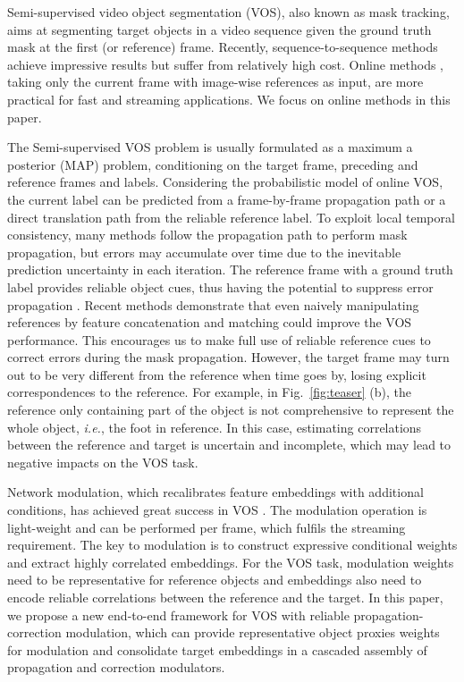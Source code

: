 \documentclass[letterpaper]{article} \usepackage{aaai22}  \usepackage{times}  \usepackage{helvet}  \usepackage{courier}  \usepackage[hyphens]{url}  \usepackage{graphicx} \urlstyle{rm} \def\UrlFont{\rm}  \usepackage{natbib}  \usepackage{caption} \DeclareCaptionStyle{ruled}{labelfont=normalfont,labelsep=colon,strut=off} \frenchspacing  \setlength{\pdfpagewidth}{8.5in}  \setlength{\pdfpageheight}{11in}  \usepackage{algorithm}
\def\ie{\textit{i.e.}}
\newcommand{\fig}[1]{Fig.~#1}
\begin{document}
Semi-supervised video object segmentation (VOS), also known as mask tracking, aims at segmenting target objects in a video sequence given the ground truth mask at the first (or reference) frame. Recently, sequence-to-sequence methods \cite{vaswani2017attention,duke2021sstvos} achieve impressive results but suffer from relatively high cost. Online methods \cite{perazzi2017learning,oh2018fast,wang2018semi,wang2019ranet}, taking only the current frame with image-wise references as input, are more practical for fast and streaming applications. We focus on online methods in this paper. 

The Semi-supervised VOS problem is usually formulated as a maximum a posterior (MAP) problem, conditioning on the target frame, preceding and reference frames and labels. 
Considering the probabilistic model of online VOS, the current label can be predicted from a frame-by-frame propagation path or a direct translation path from the reliable reference label. 
To exploit local temporal consistency, many methods \cite{oh2018fast,perazzi2017learning,NIPS2017_6c9882bb,voigtlaender2017online,cheng2017segflow,cheng2018fast,NIPS2017_6c9882bb} follow the propagation path to perform mask propagation, but errors may accumulate over time due to the inevitable prediction uncertainty in each iteration. The reference frame with a ground truth label provides reliable object cues, thus having the potential to suppress error propagation \cite{NEURIPS2020_0d5bd023}. Recent methods \cite{voigtlaender2019feelvos,yang2020collaborative} demonstrate that even naively manipulating references by feature concatenation and matching could improve the VOS performance. This encourages us to make full use of reliable reference cues to correct errors during the mask propagation.
However, the target frame may turn out to be very different from the reference when time goes by, losing explicit correspondences to the reference. For example, in \fig{\ref{fig:teaser}} (b), the reference only containing part of the object is not comprehensive to represent the whole object, \ie, the foot in reference. In this case, estimating correlations between the reference and target is uncertain and incomplete, which may lead to negative impacts on the VOS task.

Network modulation, which recalibrates feature embeddings with additional conditions, has achieved great success in VOS \cite{Yang2018osmn,yang2020collaborative}. The modulation operation is light-weight and can be performed per frame, which fulfils the streaming requirement.
The key to modulation is to construct expressive conditional weights and extract highly correlated embeddings. For the VOS task, modulation weights need to be representative for reference objects and embeddings also need to encode reliable correlations between the reference and the target.
In this paper, we propose a new end-to-end framework for VOS with reliable propagation-correction modulation, which can provide representative object proxies weights for modulation and consolidate target embeddings in a cascaded assembly of propagation and correction modulators. 
\end{document}
